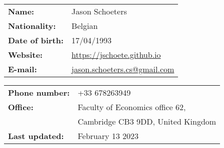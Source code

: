 \documentclass[french]{resume} %
\begin{document}
	
	\begin{minipage}[t]{0.49\textwidth}
		\begin{tabular}{ m{7em} m{15em} }
			\textbf{Name:} & Jason Schoeters\\
			\textbf{Nationality:} & Belgian\\
			\textbf{Date of birth:} & 17/04/1993\\
			\textbf{Website:} & \url{https://jschoete.github.io}\\
			\textbf{E-mail: } & \href{mailto:jason.schoeters.cs@gmail.com}{jason.schoeters.cs@gmail.com}\\
		\end{tabular}
	\end{minipage} 
	\begin{minipage}[t]{0.49\textwidth}
		\begin{tabular}{ m{8em} m{20em} }
			\textbf{Phone number: } & +33 678263949\\
			\textbf{Office:} & Faculty of Economics office 62,\\
			&Cambridge CB3 9DD, \newline United Kingdom\\
			\textbf{Last updated:} & February 13 2023
		\end{tabular}
	\end{minipage} 
	
\end{document}

